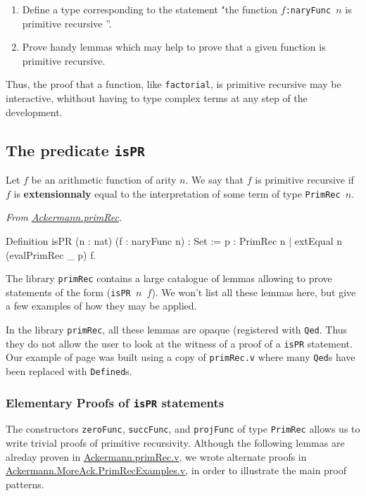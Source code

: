 \begin{enumerate}
\item Define a type corresponding to the statement "the function \texttt{$f$:naryFunc $n$} is primitive recursive ''.
\item Prove handy lemmas which may help to prove that a given function is primitive recursive.
\end{enumerate}

Thus, the proof that a function, like \texttt{factorial}, is primitive recursive may be interactive, whithout having to type complex terms at any step of the development.

\subsection{The predicate \texttt{isPR}}

Let $f$ be an arithmetic function of arity $n$. We say that $f$ is primitive recursive if $f$ is \textbf{extensionnaly}
equal to the interpretation of some term of type \texttt{PrimRec $n$}. 

\vspace{4pt}
\noindent
\emph{From \href{../theories/html/hydras.Ackermann.primRec.html}{Ackermann.primRec}.}
\begin{Coqsrc}
Definition isPR (n : nat) (f : naryFunc n) : Set :=
  {p : PrimRec n | extEqual n (evalPrimRec _ p) f}.  
\end{Coqsrc}

The library \texttt{primRec} contains a large catalogue of lemmas allowing to prove statements 
of the form (\texttt{isPR $n$ $f$}). We won't list all these lemmas here, but give a few examples of
how they may be applied.

\begin{remark}
In the library \texttt{primRec}, all these lemmas are opaque (registered with \texttt{Qed}. Thus they do not allow the user to look at the witness of a proof of a \texttt{isPR} statement. Our example of page\pageref{sect:weirdfac} was built using a  copy of \texttt{primRec.v} where many \texttt{Qed}s have been replaced with
\texttt{Defined}s.
\end{remark}

\subsubsection{Elementary Proofs of \texttt{isPR} statements}

The constructors \texttt{zeroFunc}, \texttt{succFunc},  and \texttt{projFunc} of type
\texttt{PrimRec} allows us to write trivial proofs of primitive recursivity. 
Although  the following lemmas are alreday proven in 
\href{../theories/html/hydras.Ackermann.primRec.html}{Ackermann.primRec.v},
we wrote alternate proofs in 
\href{../theories/html/hydras.Ackermann.MoreAck.PrimRecExamples.html}%
{Ackermann.MoreAck.PrimRecExamples.v}, in order to illustrate the main proof patterns.

